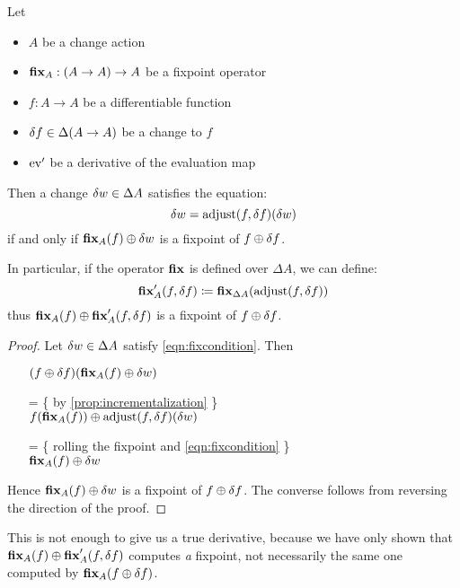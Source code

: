 \begin{thm}
\label{thm:fixpointDiff}
  Let 
  \begin{itemize}
    \item $A$ be a change action
    \item$\textbf{fix}_A : (A \rightarrow A) \rightarrow A$ be a fixpoint operator
    \item $f: A \rightarrow A$ be a differentiable function
    \item $\delta f \in \Delta (A \rightarrow A)$ be a change to $f$
    \item $\operatorname{ev}'$ be a derivative of the evaluation map
  \end{itemize}

  Then a change $\delta w \in \Delta A$ satisfies
  the equation:
  \begin{equation}\label{eqn:fixcondition}
    \delta w = \operatorname{adjust}(f, \delta f)(\delta w)
  \end{equation}
  if and only if $\textbf{fix}_A(f) \oplus \delta w$ is a fixpoint of $f \oplus \delta f$.
  
  In particular, if the operator $\textbf{fix}$ is defined over $\Delta A$, we can define:
  $$
  \textbf{fix}_A'(f, \delta f) \coloneqq
  \textbf{fix}_{\Delta A}(\operatorname{adjust}(f, \delta f))
  $$
  thus $\textbf{fix}_A(f) \oplus \textbf{fix}_A'(f, \delta f)$ is a fixpoint 
  of $f \oplus \delta f$.
\end{thm}
\begin{proof}
  Let $\delta w \in \Delta A$ satisfy \cref{eqn:fixcondition}. Then
  \begin{itemize}
  \item[ ]
    $
    (f \oplus \delta f)(\textbf{fix}_A(f) \oplus \delta w)
    $
  \item[=]\{ by \cref{prop:incrementalization} \}\\
    $
    f(\textbf{fix}_A(f))
    \oplus
    \operatorname{adjust}(f, \delta f)(\delta w)
    $
  \item[=]\{ rolling the fixpoint and \cref{eqn:fixcondition} \}\\
    $
    \textbf{fix}_A(f)
    \oplus
    \delta w
    $
  \end{itemize}
  Hence $\textbf{fix}_A(f) \oplus \delta w$ is a fixpoint of $f \oplus \delta f$. The converse
  follows from reversing the direction of the proof.
\end{proof}

This is not enough to give us a true derivative, because we have only shown 
that $\textbf{fix}_A(f) \oplus \textbf{fix}_A'(f, \delta f)$ computes \emph{a} fixpoint, not necessarily
the same one computed by $\textbf{fix}_A{(f \oplus \delta f)}$.

